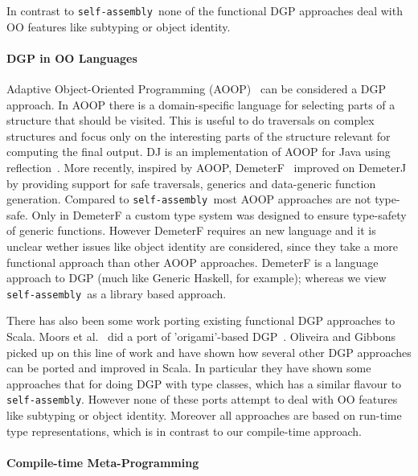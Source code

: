 \documentclass[preprint,nocopyrightspace]{sigplanconf}
\newcommand{\selfassembly}{\texttt{self-assembly~}}
\newcommand{\sselfassembly}{\texttt{self-assembly}}
\begin{document}
In contrast to \selfassembly none of the functional DGP approaches
deal with OO features like subtyping or object identity.

\paragraph{DGP in OO Languages} Adaptive Object-Oriented Programming
(AOOP)~\cite{DemeterBook} can be considered a DGP approach. In AOOP
there is a domain-specific language for selecting parts of a structure
that should be visited. This is useful to do traversals on complex
structures and focus only on the interesting parts of the structure
relevant for computing the final output.  DJ is an implementation of
AOOP for Java using reflection~\cite{DJ}. More recently, inspired by
AOOP, DemeterF~\cite{OOGP} improved on DemeterJ by providing support for
safe traversals, generics and data-generic function generation.
Compared to \selfassembly most AOOP approaches are not type-safe. Only in
DemeterF a custom type system was designed to ensure type-safety of
generic functions. However DemeterF requires an new language and it
is unclear wether issues like object identity are considered, since
they take a more functional approach than other AOOP approaches.
DemeterF is a language approach to DGP (much like Generic Haskell, for
example); whereas we view \selfassembly as a library based approach.

There has also been some work porting existing functional DGP
approaches to Scala.  Moors et al.~\cite{OODGPMoors} did a port of
'origami'-based DGP~\cite{DGPGibbons}. Oliveira and
Gibbons~\cite{ScalaGenericProgrammers} picked up on this line of work
and have shown how several other DGP approaches can be ported and
improved in Scala. In particular they have shown some approaches that
for doing DGP with type classes, which has a similar flavour to
\sselfassembly.  However none of these ports attempt to deal with OO
features like subtyping or object identity. Moreover all approaches
are based on run-time type representations, which is in contrast to
our compile-time approach.

\paragraph{Compile-time Meta-Programming}


\end{document}
